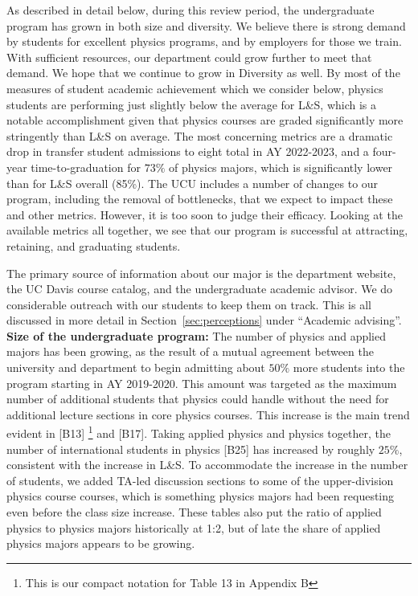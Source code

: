 \documentclass[12pt]{article}
\begin{document}
\noindent
As described in detail below, during this review period, the
undergraduate program has grown in both size and diversity.  We
believe there is strong demand by students for excellent physics
programs, and by employers for those we train.  With sufficient
resources, our department could grow further to meet that demand.  We
hope that we continue to grow in Diversity as well.  By most of the
measures of student academic achievement which we consider below,
physics students are performing just slightly below the average for
L\&S, which is a notable accomplishment given that physics courses are
graded significantly more stringently than L\&S on average.  The most
concerning metrics are a dramatic drop in transfer student admissions
to eight total in AY 2022-2023, and a four-year time-to-graduation for
$73\%$ of physics majors, which is significantly lower than for L\&S
overall (85\%).  The UCU includes a number of changes to our program,
including the removal of bottlenecks, that we expect to impact these
and other metrics.  However, it is too soon to judge their efficacy.
Looking at the available metrics all together, we see that our program
is successful at attracting, retaining, and graduating students.

The primary source of information about our major is the department
website, the UC Davis course catalog, and the undergraduate academic
advisor.  We do considerable outreach with our students to keep them
on track.  This is all discussed in more detail in
Section~\ref{sec:perceptions} under ``Academic advising''.\\[3pt]

\noindent
{\bf Size of the undergraduate program:} The number of physics and
applied majors has been growing, as the result of a mutual agreement
between the university and department to begin admitting about $50\%$
more students into the program starting in AY 2019-2020.  This amount
was targeted as the maximum number of additional students that physics
could handle without the need for additional lecture sections in core
physics courses.  This increase is the main trend evident in [B13]
\footnote{This is our compact notation for Table 13 in Appendix B}
and [B17]. Taking applied physics and physics together, the number of
international students in physics [B25] has increased by roughly
$25\%$, consistent with the increase in L\&S.  To accommodate the
increase in the number of students, we added TA-led discussion
sections to some of the upper-division physics course courses, which
is something physics majors had been requesting even before the class
size increase.  These tables also put the ratio of applied physics to
physics majors historically at 1:2, but of late the share of applied
physics majors appears to be growing.\\[3pt]
\end{document}
